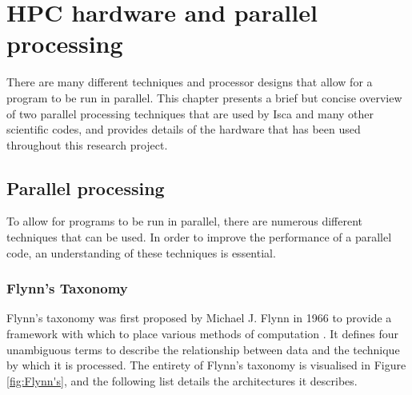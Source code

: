 \documentclass[a4paper,11pt]{report}
\begin{document}
\chapter{HPC hardware and parallel processing}
There are many different techniques and processor designs that allow for a program to be run in parallel. This chapter presents a brief but concise overview of two parallel processing techniques that are used by Isca and many other scientific codes, and provides details of the hardware that has been used throughout this research project.

\section{Parallel processing}
To allow for programs to be run in parallel, there are numerous different techniques that can be used. In order to improve the performance of a parallel code, an understanding of these techniques is essential.

\subsection{Flynn's Taxonomy}
Flynn's taxonomy was first proposed by Michael J. Flynn in 1966 to provide a framework with which to place various methods of computation \cite{flynn1972some}. It defines four unambiguous terms to describe the relationship between data and the technique by which it is processed. The entirety of Flynn's taxonomy is visualised in Figure \ref{fig:Flynn's}, and the following list details the architectures it describes.
\end{document}
